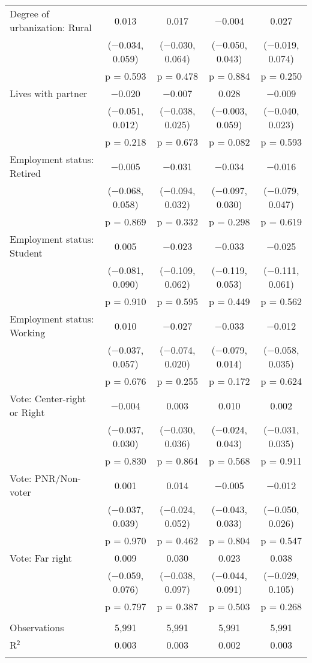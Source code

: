 \begin{tabular}{@{\extracolsep{5pt}}lcccc}
  Degree of urbanization: Rural & 0.013 & 0.017 & $-$0.004 & 0.027 \\ 
  & ($-$0.034, 0.059) & ($-$0.030, 0.064) & ($-$0.050, 0.043) & ($-$0.019, 0.074) \\ 
  & p = 0.593 & p = 0.478 & p = 0.884 & p = 0.250 \\ 
  Lives with partner & $-$0.020 & $-$0.007 & 0.028 & $-$0.009 \\ 
  & ($-$0.051, 0.012) & ($-$0.038, 0.025) & ($-$0.003, 0.059) & ($-$0.040, 0.023) \\ 
  & p = 0.218 & p = 0.673 & p = 0.082 & p = 0.593 \\ 
  Employment status: Retired & $-$0.005 & $-$0.031 & $-$0.034 & $-$0.016 \\ 
  & ($-$0.068, 0.058) & ($-$0.094, 0.032) & ($-$0.097, 0.030) & ($-$0.079, 0.047) \\ 
  & p = 0.869 & p = 0.332 & p = 0.298 & p = 0.619 \\ 
  Employment status: Student & 0.005 & $-$0.023 & $-$0.033 & $-$0.025 \\ 
  & ($-$0.081, 0.090) & ($-$0.109, 0.062) & ($-$0.119, 0.053) & ($-$0.111, 0.061) \\ 
  & p = 0.910 & p = 0.595 & p = 0.449 & p = 0.562 \\ 
  Employment status: Working & 0.010 & $-$0.027 & $-$0.033 & $-$0.012 \\ 
  & ($-$0.037, 0.057) & ($-$0.074, 0.020) & ($-$0.079, 0.014) & ($-$0.058, 0.035) \\ 
  & p = 0.676 & p = 0.255 & p = 0.172 & p = 0.624 \\ 
  Vote: Center\mbox{-}right or Right & $-$0.004 & 0.003 & 0.010 & 0.002 \\ 
  & ($-$0.037, 0.030) & ($-$0.030, 0.036) & ($-$0.024, 0.043) & ($-$0.031, 0.035) \\ 
  & p = 0.830 & p = 0.864 & p = 0.568 & p = 0.911 \\ 
  Vote: PNR\slash Non\mbox{-}voter & 0.001 & 0.014 & $-$0.005 & $-$0.012 \\ 
  & ($-$0.037, 0.039) & ($-$0.024, 0.052) & ($-$0.043, 0.033) & ($-$0.050, 0.026) \\ 
  & p = 0.970 & p = 0.462 & p = 0.804 & p = 0.547 \\ 
  Vote: Far right & 0.009 & 0.030 & 0.023 & 0.038 \\ 
  & ($-$0.059, 0.076) & ($-$0.038, 0.097) & ($-$0.044, 0.091) & ($-$0.029, 0.105) \\ 
  & p = 0.797 & p = 0.387 & p = 0.503 & p = 0.268 \\ 
 \hline \\[-1.8ex] 

Observations & 5,991 & 5,991 & 5,991 & 5,991 \\ 
R$^{2}$ & 0.003 & 0.003 & 0.002 & 0.003 \\ 
\hline 
\hline \\[-1.8ex] 
\end{tabular} 